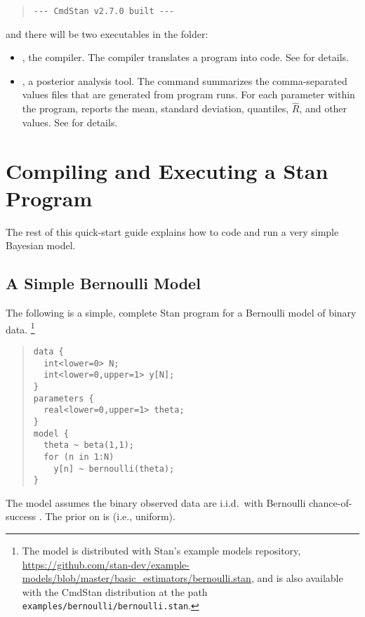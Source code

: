 %
\begin{quote}
  \begin{Verbatim}
--- CmdStan v2.7.0 built ---
  \end{Verbatim}
\end{quote}
%
and there will be two executables in the  folder:
%
\begin{itemize}
  \item {}, the \Stan compiler. The \Stan compiler
    translates a \Stan program into \Cpp code. See 
    for details.
  \item {}, a posterior analysis tool. The 
    command summarizes the comma-separated values files that are
    generated from \Stan program runs. For each parameter within the
    \Stan program,  reports the mean, standard deviation,
    quantiles, $\hat{R}$, and other values. See  for
    details.
\end{itemize}

\section{Compiling and Executing a Stan Program}\label{compiling-model.section}

The rest of this quick-start guide explains how to code and run a very
simple Bayesian model.

\subsection{A Simple Bernoulli Model}

The following is a simple, complete Stan program for a Bernoulli model
of binary data.%
%
\footnote{The model is distributed with Stan's example models
  repository,
  \url{https://github.com/stan-dev/example-models/blob/master/basic_estimators/bernoulli.stan},
  and is also available with the CmdStan distribution at the path
  \nolinkurl{examples/bernoulli/bernoulli.stan}.  }
%
\begin{quote}
\begin{Verbatim}
data {
  int<lower=0> N;
  int<lower=0,upper=1> y[N];
}
parameters {
  real<lower=0,upper=1> theta;
}
model {
  theta ~ beta(1,1);
  for (n in 1:N)
    y[n] ~ bernoulli(theta);
}
\end{Verbatim}
\end{quote}
%
The model assumes the binary observed data 
are i.i.d.\ with Bernoulli chance-of-success .  The
prior on  is  (i.e., uniform).

